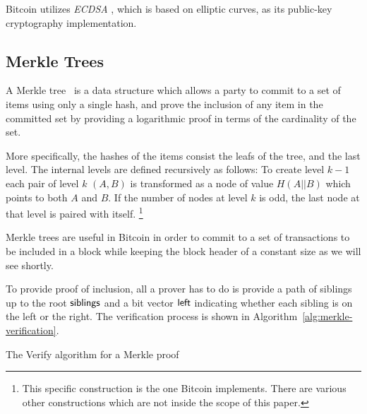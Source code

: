 Bitcoin utilizes \textit{ECDSA} \cite{devguide}, which is based on elliptic curves, as its public-key cryptography implementation.

\subsection{\label{sec:merkle-trees}Merkle Trees}
A Merkle tree~\cite{merkle} is a data structure which allows a party to commit to a set of items using only a single hash, and prove the inclusion of any item in the committed set by providing a logarithmic proof in terms of the cardinality of the set.

More specifically, the hashes of the items consist the leafs of the tree, and the last level. The internal levels are defined recursively as follows: To create level $k-1$ each pair of level $k$ $(A, B)$ is transformed as a node of value $H(A || B)$ which points to both $A$ and $B$. If the number of nodes at level $k$ is odd, the last node at that level is paired with itself.
\footnote{This specific construction is the one Bitcoin implements. There are various other constructions which are not inside the scope of this paper.}

Merkle trees are useful in Bitcoin in order to commit to a set of transactions to be included in a block while keeping the block header of a constant size as we will see shortly.

To provide proof of inclusion, all a prover has to do is provide a path of siblings up to the root $\sf{siblings}$ and a bit vector $\sf{left}$ indicating whether each sibling is on the left or the right. The verification process is shown in Algorithm~\ref{alg:merkle-verification}.

\begin{algorithm}[H]
  \caption{\label{alg:merkle-verification}The \textsf{Verify} algorithm
    for a Merkle proof}
    \begin{algorithmic}[1]
              \Else
              \EndIf
            \EndWhile
            \State{}
        \EndFunction
    \end{algorithmic}
\end{algorithm}

